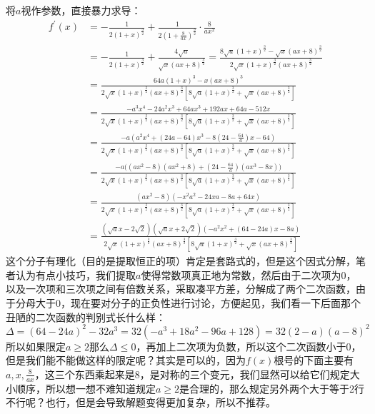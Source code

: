 \begin{solution}
将$a$视作参数，直接暴力求导：
\begin{align*}f^{\prime}(x)&=-\frac{1}{2(1+x)^{\frac{3}{2}}}+\frac{1}{2(1+\frac{8}{ax})^{\frac{3}{2}}}\cdot\frac{8}{ax^2}\\&=-\frac{1}{2(1+x)^\frac{3}{2}}+\frac{4\sqrt{a}}{\sqrt{x}(ax+8)^\frac{3}{2}}=\frac{8\sqrt{a}(1+x)^\frac{3}{2}-\sqrt{x}(ax+8)^\frac{3}{2}}{2\sqrt{x}(1+x)^\frac{3}{2}(ax+8)^\frac{3}{2}}\\&=\frac{64a(1+x)^3-x(ax+8)^3}{2\sqrt{x}(1+x)^{\frac{3}{2}}(ax+8)^{\frac{3}{2}}\left[8\sqrt{a}(1+x)^{\frac{3}{2}}+\sqrt{x}(ax+8)^{\frac{3}{2}}\right]}\\&=\frac{-a^3x^4-24a^2x^3+64ax^3+192ax+64a-512x}{2\sqrt{x}(1+x)^{\frac{3}{2}}(ax+8)^{\frac{3}{2}}\left[8\sqrt{a}(1+x)^{\frac{3}{2}}+\sqrt{x}(ax+8)^{\frac{3}{2}}\right]}\\
&=\frac{-a(a^2x^4+(24a-64)x^3-8(24-\frac{64}{a})x-64)}{2\sqrt{x}(1+x)^{\frac{3}{2}}(ax+8)^{\frac{3}{2}}\left[8\sqrt{a}(1+x)^{\frac{3}{2}}+\sqrt{x}(ax+8)^{\frac{3}{2}}\right]}\\
&=\frac{-a\bigg((ax^2-8)(ax^2+8)+(24-\frac{64}{a})(ax^3-8x)\bigg)}{2\sqrt{x}(1+x)^{\frac{3}{2}}(ax+8)^{\frac{3}{2}}\left[8\sqrt{a}(1+x)^{\frac{3}{2}}+\sqrt{x}(ax+8)^{\frac{3}{2}}\right]}\\
&=\frac{\left(ax^{2}-8 \right) \left(-x^{2}a^{2}-24xa-8a+64x \right)}{2\sqrt{x}(1+x)^{\frac{3}{2}}(ax+8)^{\frac{3}{2}}\left[8\sqrt{a}(1+x)^{\frac{3}{2}}+\sqrt{x}(ax+8)^{\frac{3}{2}}\right]}\\
&=\frac{(\sqrt{a}x-2\sqrt2)(\sqrt{a}x+2\sqrt2)(-a^2x^2+(64-24a)x-8a)}{2\sqrt{x}(1+x)^{\frac{3}{2}}(ax+8)^{\frac{3}{2}}\left[8\sqrt{a}(1+x)^{\frac{3}{2}}+\sqrt{x}(ax+8)^{\frac{3}{2}}\right]}
\end{align*}
这个分子有理化（目的是提取恒正的项）肯定是套路式的，但是这个因式分解，笔者认为有点小技巧，我们提取$a$使得常数项真正地为常数，然后由于二次项为0，以及一次项和三次项之间有倍数关系，采取凑平方差，分解成了两个二次函数，由于分母大于0，现在要对分子的正负性进行讨论，方便起见，我们看一下后面那个丑陋的二次函数的判别式长什么样：
\[\Delta = (64-24a)^2-32a^3=32(-a^3+18a^2-96a+128)=32(2-a)(a-8)^2\]
所以如果限定$a\geq 2$那么$\Delta\leq 0$，再加上二次项为负数，所以这个二次函数小于0，但是我们能不能做这样的限定呢？其实是可以的，因为$f(x)$根号的下面主要有$a,x,\frac{8}{ax}$，这三个东西乘起来是$8$，是对称的三个变元，我们显然可以给它们规定大小顺序，所以想一想不难知道规定$a\geq 2$是合理的，那么规定另外两个大于等于2行不行呢？也行，但是会导致解题变得更加复杂，所以不推荐。


\end{solution}
